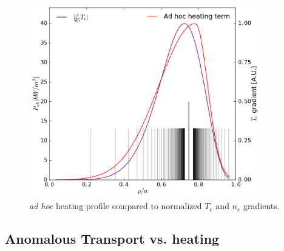 \begin{figure}
    \centering
    \includegraphics[width = 0.9\textwidth]{ion_transport_results/adhoc_profile.png}
    \caption[\textit{ad hoc} heating profile compared to gradients]{\textit{ad hoc} heating profile compared to normalized $T_e$ and $n_e$ gradients.}
    \label{fig:ad_hoc_v_gradient}
\end{figure}

\subsection{Anomalous Transport vs. heating}


